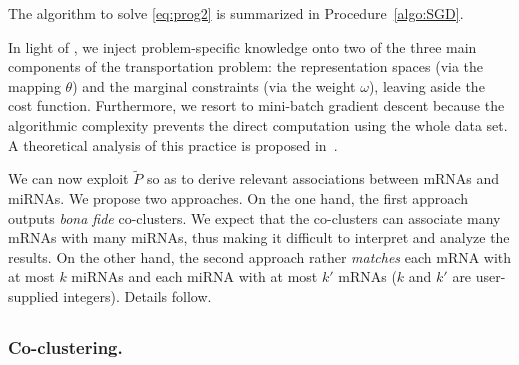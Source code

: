 The    algorithm    to    solve     \eqref{eq:prog2}    is    summarized    in
Procedure~\ref{algo:SGD}.  

In light of \citep[Section  1.3, page~25]{MAD2019}, we inject problem-specific
knowledge onto two of the three main components of the transportation problem:
the  representation  spaces  (via  the  mapping  $\theta$)  and  the  marginal
constraints  (via  the weight  $\omega$),  leaving  aside the  cost  function.
Furthermore, we resort to mini-batch  gradient descent because the algorithmic
complexity  prevents the  direct  computation  using the  whole  data set.   A
theoretical analysis of this practice is proposed in~\citep{fatras2020}.

We can now  exploit $\tilde{P}$ so as to derive  relevant associations between
mRNAs and  miRNAs.  We  propose two  approaches.  On the  one hand,  the first
approach  outputs   \textit{bona  fide}  co-clusters.   We   expect  that  the
co-clusters  can  associate  many  mRNAs  with many  miRNAs,  thus  making  it
difficult to interpret and analyze the results.  On the other hand, the second
approach rather  \textit{matches} each mRNA with  at most $k$ miRNAs  and each
miRNA   with  at   most   $k'$   mRNAs  ($k$   and   $k'$  are   user-supplied
integers). Details follow.


\subsection{}
\label{subsec:algos}


\subsubsection{Co-clustering.}
\label{subsubsec:co-clust}


